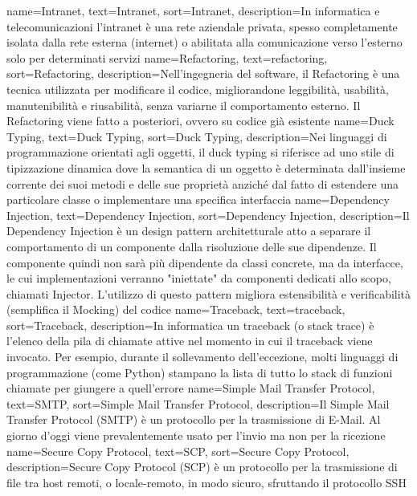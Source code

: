 {
	name=Intranet,
	text=Intranet,
	sort=Intranet,
	description={In informatica e telecomunicazioni l'intranet è una rete aziendale privata, spesso completamente isolata dalla rete esterna (internet) o abilitata alla comunicazione verso l'esterno solo per determinati servizi}
}
{
	name=Refactoring,
	text=refactoring,
	sort=Refactoring,
	description={Nell'ingegneria del software, il Refactoring è una tecnica utilizzata per modificare il codice, migliorandone leggibilità, usabilità, manutenibilità e riusabilità, senza variarne il comportamento esterno. Il Refactoring viene fatto a posteriori, ovvero su codice già esistente}
}
{
	name=Duck Typing,
	text=Duck Typing,
	sort=Duck Typing,
	description={Nei linguaggi di programmazione orientati agli oggetti, il duck typing si riferisce ad uno stile di tipizzazione dinamica dove la semantica di un oggetto è determinata dall'insieme corrente dei suoi metodi e delle sue proprietà anziché dal fatto di estendere una particolare classe o implementare una specifica interfaccia}
}
{
	name=Dependency Injection,
	text=Dependency Injection,
	sort=Dependency Injection,
	description={Il Dependency Injection è un design pattern architetturale atto a separare il comportamento di un componente dalla risoluzione delle sue dipendenze. Il componente quindi non sarà più dipendente da classi concrete, ma da interfacce, le cui implementazioni verranno "iniettate" da componenti dedicati allo scopo, chiamati Injector. L'utilizzo di questo pattern migliora estensibilità e verificabilità (semplifica il Mocking) del codice}
}
{
	name=Traceback,
	text=traceback,
	sort=Traceback,
	description={In informatica un traceback (o stack trace) è l'elenco della pila di chiamate attive nel momento in cui il traceback viene invocato. Per esempio, durante il sollevamento dell'eccezione, molti linguaggi di programmazione (come Python) stampano la lista di tutto lo stack di funzioni chiamate per giungere a quell'errore}
}
{
	name=Simple Mail Transfer Protocol,
	text=SMTP,
	sort=Simple Mail Transfer Protocol,
	description={Il Simple Mail Transfer Protocol (SMTP) è un protocollo per la trasmissione di E-Mail. Al giorno d'oggi viene prevalentemente usato per l'invio ma non per la ricezione}
}
{
	name=Secure Copy Protocol,
	text=SCP,
	sort=Secure Copy Protocol,
	description={Secure Copy Protocol (SCP) è un protocollo per la trasmissione di file tra host remoti, o locale-remoto, in modo sicuro, sfruttando il protocollo SSH}
}
